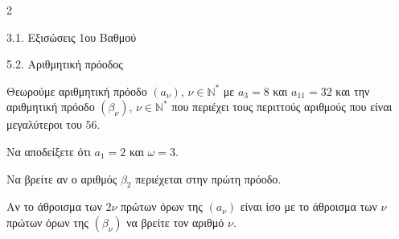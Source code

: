 \begin{ylh}{2}
    \item 3.1. Εξισώσεις 1ου Βαθμού
    \item 5.2. Αριθμητική πρόοδος
\end{ylh}
Θεωρούμε αριθμητική πρόοδο $(a_\nu)$, $\nu \in \mathbb{N}^*$ με $a_3 = 8$ και $a_{11} = 32$ και την αριθμητική πρόοδο $(\beta_\nu)$, $\nu \in \mathbb{N}^*$ που περιέχει τους περιττούς αριθμούς που είναι μεγαλύτεροι του $56$.

\begin{alist}
\item Να αποδείξετε ότι $a_1 = 2$ και $\omega = 3$.
\item Να βρείτε αν ο αριθμός $\beta_2$ περιέχεται στην πρώτη πρόοδο.
\item Αν το άθροισμα των $2\nu$ πρώτων όρων της $(a_\nu)$ είναι ίσο με το άθροισμα των $\nu$ πρώτων όρων της $(\beta_\nu)$ να βρείτε τον αριθμό $\nu$.
\end{alist}

